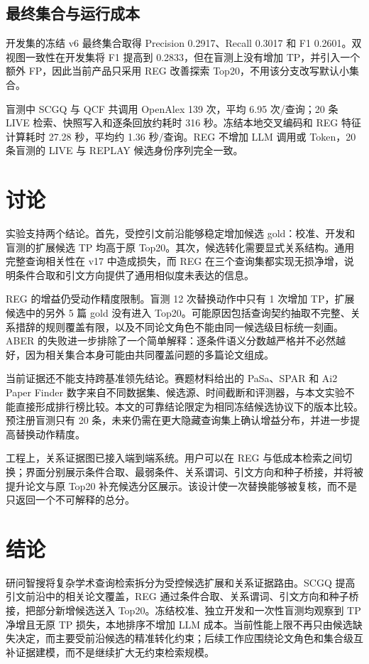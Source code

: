 \documentclass[a4paper,11pt]{ctexart}
\begin{document}
\subsection{最终集合与运行成本}
开发集的冻结 v6 最终集合取得 Precision 0.2917、Recall 0.3017 和 F1 0.2601。双视图一致性在开发集将 F1 提高到 0.2833，但在盲测上没有增加 TP，并引入一个额外 FP，因此当前产品只采用 REG 改善探索 Top20，不用该分支改写默认小集合。

盲测中 SCGQ 与 QCF 共调用 OpenAlex 139 次，平均 6.95 次/查询；20 条 LIVE 检索、快照写入和逐条回放约耗时 316 秒。冻结本地交叉编码和 REG 特征计算耗时 27.28 秒，平均约 1.36 秒/查询。REG 不增加 LLM 调用或 Token，20 条盲测的 LIVE 与 REPLAY 候选身份序列完全一致。

\section{讨论}
实验支持两个结论。首先，受控引文前沿能够稳定增加候选 gold：校准、开发和盲测的扩展候选 TP 均高于原 Top20。其次，候选转化需要显式关系结构。通用完整查询相关性在 v17 中造成损失，而 REG 在三个查询集都实现无损净增，说明条件合取和引文方向提供了通用相似度未表达的信息。

REG 的增益仍受动作精度限制。盲测 12 次替换动作中只有 1 次增加 TP，扩展候选中的另外 5 篇 gold 没有进入 Top20。可能原因包括查询契约抽取不完整、关系措辞的规则覆盖有限，以及不同论文角色不能由同一候选级目标统一刻画。ABER 的失败进一步排除了一个简单解释：逐条件语义分数越严格并不必然越好，因为相关集合本身可能由共同覆盖问题的多篇论文组成。

当前证据还不能支持跨基准领先结论。赛题材料给出的 PaSa、SPAR 和 Ai2 Paper Finder 数字来自不同数据集、候选源、时间截断和评测器，与本文实验不能直接形成排行榜比较。本文的可靠结论限定为相同冻结候选协议下的版本比较。预注册盲测只有 20 条，未来仍需在更大隐藏查询集上确认增益分布，并进一步提高替换动作精度。

工程上，关系证据图已接入端到端系统。用户可以在 REG 与低成本检索之间切换；界面分别展示条件合取、最弱条件、关系谓词、引文方向和种子桥接，并将被提升论文与原 Top20 补充候选分区展示。该设计使一次替换能够被复核，而不是只返回一个不可解释的总分。

\section{结论}
研问智搜将复杂学术查询检索拆分为受控候选扩展和关系证据路由。SCGQ 提高引文前沿中的相关论文覆盖，REG 通过条件合取、关系谓词、引文方向和种子桥接，把部分新增候选送入 Top20。冻结校准、独立开发和一次性盲测均观察到 TP 净增且无原 TP 损失，本地排序不增加 LLM 成本。当前性能上限不再只由候选缺失决定，而主要受前沿候选的精准转化约束；后续工作应围绕论文角色和集合级互补证据建模，而不是继续扩大无约束检索规模。
\end{document}
